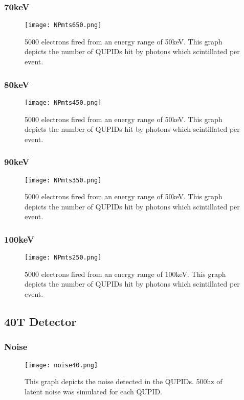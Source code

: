 \documentclass[11pt,a4paper,oneside]{report}
\begin{document}
\subsubsection{70keV}
\begin{figure}[htb]
\centering
\texttt{[image: NPmts650.png]}
\caption{5000 electrons fired from an energy range of 50keV. This graph depicts the number of QUPIDs hit by photons which scintillated per event.}
\end{figure}

\newpage
\subsubsection{80keV}
\begin{figure}[htb]
\centering
\texttt{[image: NPmts450.png]}
\caption{5000 electrons fired from an energy range of 50keV. This graph depicts the number of QUPIDs hit by photons which scintillated per event.}
\end{figure}

\subsubsection{90keV}
\begin{figure}[htb]
\centering
\texttt{[image: NPmts350.png]}
\caption{5000 electrons fired from an energy range of 50keV. This graph depicts the number of QUPIDs hit by photons which scintillated per event.}
\end{figure}

\newpage
\subsubsection{100keV}
\begin{figure}[htb]
\centering
\texttt{[image: NPmts250.png]}
\caption{5000 electrons fired from an energy range of 100keV. This graph depicts the number of QUPIDs hit by photons which scintillated per event.}
\end{figure}

\newpage
\subsection{40T Detector}
\subsubsection{Noise}
\begin{figure}[htb]
\centering
\texttt{[image: noise40.png]}
\caption{This graph depicts the noise detected in the QUPIDs. 500hz of latent noise was simulated for each QUPID.}
\end{figure}
\end{document}
